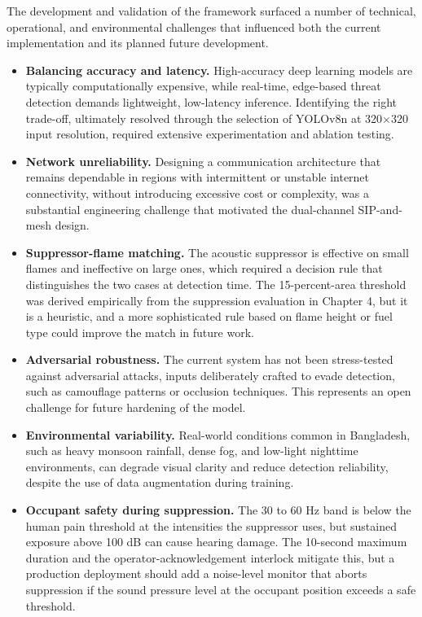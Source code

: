 The development and validation of the framework surfaced a number of technical, operational, and environmental challenges that influenced both the current implementation and its planned future development.

\begin{itemize}
\item \textbf{Balancing accuracy and latency.} High-accuracy deep learning models are typically computationally expensive, while real-time, edge-based threat detection demands lightweight, low-latency inference. Identifying the right trade-off, ultimately resolved through the selection of YOLOv8n at 320$\times$320 input resolution, required extensive experimentation and ablation testing.

\item \textbf{Network unreliability.} Designing a communication architecture that remains dependable in regions with intermittent or unstable internet connectivity, without introducing excessive cost or complexity, was a substantial engineering challenge that motivated the dual-channel SIP-and-mesh design.

\item \textbf{Suppressor-flame matching.} The acoustic suppressor is effective on small flames and ineffective on large ones, which required a decision rule that distinguishes the two cases at detection time. The 15-percent-area threshold was derived empirically from the suppression evaluation in Chapter 4, but it is a heuristic, and a more sophisticated rule based on flame height or fuel type could improve the match in future work.

\item \textbf{Adversarial robustness.} The current system has not been stress-tested against adversarial attacks, inputs deliberately crafted to evade detection, such as camouflage patterns or occlusion techniques. This represents an open challenge for future hardening of the model.

\item \textbf{Environmental variability.} Real-world conditions common in Bangladesh, such as heavy monsoon rainfall, dense fog, and low-light nighttime environments, can degrade visual clarity and reduce detection reliability, despite the use of data augmentation during training.

\item \textbf{Occupant safety during suppression.} The 30 to 60 Hz band is below the human pain threshold at the intensities the suppressor uses, but sustained exposure above 100 dB can cause hearing damage. The 10-second maximum duration and the operator-acknowledgement interlock mitigate this, but a production deployment should add a noise-level monitor that aborts suppression if the sound pressure level at the occupant position exceeds a safe threshold.


\end{itemize}

